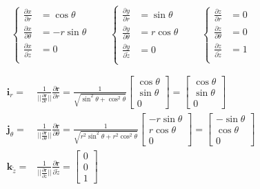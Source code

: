 \documentclass
[
a4paper,                      %
twoside,					  %
12pt,                         %
abstract,		      %
fleqn,                        %
]
{scrartcl} %
\begin{document}
\begin{description}
\begin{equation}
\begin{cases}
\frac{\partial x}{\partial r}&=\cos{\theta}\\
\frac{\partial x}{\partial \theta}&=-r\sin{\theta}\\
\frac{\partial x}{\partial \tilde{z}}&=0\\
\end{cases}\qquad\begin{cases}
\frac{\partial y}{\partial r}&=\sin{\theta}\\
\frac{\partial y}{\partial \theta}&=r\cos{\theta}\\
\frac{\partial y}{\partial \tilde{z}}&=0\\
\end{cases}\qquad\begin{cases}
\frac{\partial z}{\partial r}&=0\\
\frac{\partial z}{\partial \theta}&=0\\
\frac{\partial z}{\partial \tilde{z}}&=1\\
\end{cases}
\end{equation}

\begin{equation}
\begin{aligned}
\mathbf{i}_{r}=&\frac{1}{\lvert\lvert\frac{\partial \mathbf{r}}{\partial r}\rvert\rvert}\frac{\partial \mathbf{r}}{\partial r}=\frac{1}{\sqrt{\sin^{2}{\theta}+\cos^{2}{\theta}}}\begin{bmatrix}
\cos{\theta}\\[5pt]
\sin{\theta}\\[5pt]
0\end{bmatrix}=\begin{bmatrix}
\cos{\theta}\\[5pt]
\sin{\theta}\\[5pt]
0\end{bmatrix}\\
\mathbf{j}_{\theta}=&\frac{1}{\lvert\lvert\frac{\partial \mathbf{r}}{\partial\theta}\rvert\rvert}\frac{\partial \mathbf{r}}{\partial\theta}=\frac{1}{\sqrt{r^{2}\sin^{2}{\theta}+r^{2}\cos^{2}{\theta}}}\begin{bmatrix}
-r\sin{\theta}\\[5pt]
r\cos{\theta}\\[5pt]
0\end{bmatrix}=\begin{bmatrix}
-\sin{\theta}\\[5pt]
\cos{\theta}\\[5pt]
0\end{bmatrix}\\
\mathbf{k}_{\tilde{z}}=&\frac{1}{\lvert\lvert\frac{\partial \mathbf{r}}{\partial\tilde{z}}\rvert\rvert}\frac{\partial \mathbf{r}}{\partial\tilde{z}}=\begin{bmatrix}
0\\[5pt]
0\\[5pt]
1\end{bmatrix}
\end{aligned}
\end{equation}


\end{description}
\end{document}
